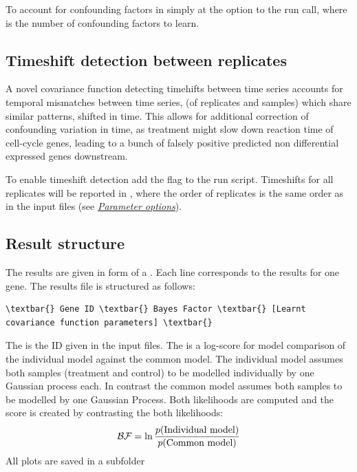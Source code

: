 \documentclass[letterpaper,10pt,english]{sphinxmanual}
\begin{document}
To account for confounding factors in  simply at the
option  to the run call, where  is the number of
confounding factors to learn.


\subsection{Timeshift detection between replicates}
\label{timeshift:timeshift}\label{timeshift::doc}\label{timeshift:timeshift-detection-between-replicates}
A novel covariance function detecting timehifts between
time series accounts for temporal mismatches between time series, (of
replicates and samples) which share similar patterns, shifted in
time. This allows for additional correction of confounding variation
in time, as treatment might slow down reaction time of cell-cycle
genes, leading to a bunch of falsely positive predicted non differential
expressed genes downstream.

To enable timeshift detection add the flag  to the run
script. Timeshifts for all replicates will be reported in
, where the order of replicates is the same order as in
the input files  (see {\hyperref[usage:usage]{\emph{Parameter options}}}).


\subsection{Result structure}
\label{results:result-structure}\label{results::doc}\label{results:results}
The results are given in form of a . Each line corresponds to the results for one gene. The results file is structured as follows:

\begin{Verbatim}[commandchars=\\\{\}]
\textbar{} Gene ID \textbar{} Bayes Factor \textbar{} [Learnt covariance function parameters] \textbar{}
\end{Verbatim}

The  is the ID given in the input files. The  is a log-score for model comparison of the individual model against the common model. The individual model assumes both samples (treatment and control) to be modelled individually by one Gaussian process each. In contrast the common model assumes both samples to be modelled by one Gaussian Process. Both likelihoods are computed and the score is created by contrasting the both likelihoods:
\begin{gather}
\begin{split}\mathcal{BF} = \ln \frac{p(\text{Individual model})}{p(\text{Common model})}\end{split}\notag
\end{gather}
All plots are saved in a subfolder 
\end{document}
